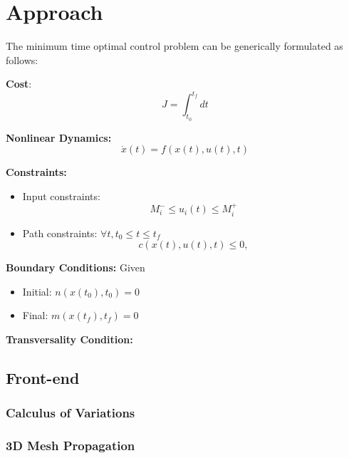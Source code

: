 
\section{Approach}
\label{sec:mathematical_formulation}

The minimum time optimal control problem can be generically formulated as follows:

\textbf{Cost}: $$J=\int_{t_{0}}^{t_{f}} d t$$

\textbf{Nonlinear Dynamics:} $$\dot{x}(t)= f(x(t), u(t), t)$$

\textbf{Constraints:} 
\begin{itemize}
  \item Input constraints:
    $$M_{i}^{-} \leq u_{i}(t) \leq M_{i}^{+}$$
  \item Path constraints:
  $\forall t, t_{0} \leq t \leq t_{f}$ 
  $$c(x(t), u(t), t) \leq 0,$$
\end{itemize}

\textbf{Boundary Conditions:}
Given 
\begin{itemize}
  \item Initial: $n(x(t_{0}), t_{0}) = 0$
  \item Final: $m(x(t_{f}), t_{f}) = 0$
\end{itemize}

\textbf{Transversality Condition:}

\subsection{Front-end}
\label{ssec:frontend}

\subsubsection{Calculus of Variations}
\label{sssec:3d_mesh_generation}

\subsubsection{3D Mesh Propagation}